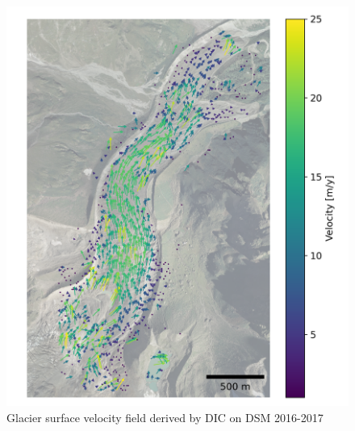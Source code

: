 \begin{figure}
    \centering
    \includegraphics[height=\textheight]{figures/chapter3/velocity_DIC_2016-2017.png}
    \caption[]{Glacier surface velocity field derived by DIC on DSM 2016-2017}
\end{figure}

